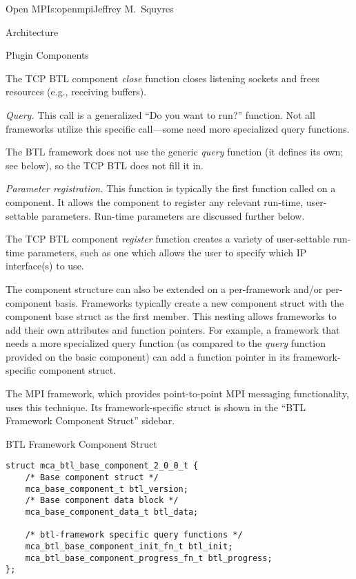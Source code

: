 \begin{aosachapter}{Open MPI}{s:openmpi}{Jeffrey M.\ Squyres}
\begin{aosasect1}{Architecture}
\begin{aosasect2}{Plugin Components}
\begin{aosaitemize}
  The TCP BTL component \emph{close} function closes listening sockets
  and frees resources (e.g., receiving buffers).

\item \emph{Query.} This call is a generalized ``Do you want to run?''
  function.  Not all frameworks utilize this specific call---some
  need more specialized query functions.

  The BTL framework does not use the generic \emph{query} function (it
  defines its own; see below), so the TCP BTL does not fill it in.

\item \emph{Parameter registration.} This function is typically the
  first function called on a component.  It allows the component to
  register any relevant run-time, user-settable parameters.  Run-time
  parameters are discussed further below.


  The TCP BTL component \emph{register} function creates a variety of
  user-settable run-time parameters, such as one which allows the
  user to specify which IP interface(s) to use.
\end{aosaitemize}

The component structure can also be extended on a per-framework and/or
per-component basis.  Frameworks typically create a new component
struct with the component base struct as the first member.
%
This nesting allows frameworks to add their own attributes and
function pointers.  
%
For example, a framework that needs a more specialized query function
(as compared to the \emph{query} function provided on the basic
component) can add a function pointer in its framework-specific
component struct.

The MPI  framework, which provides point-to-point MPI
messaging functionality, uses this technique.  Its framework-specific
struct is shown in the ``BTL Framework Component Struct'' sidebar.

\begin{aosabox}{BTL Framework Component Struct}
\begin{verbatim}
struct mca_btl_base_component_2_0_0_t {
    /* Base component struct */
    mca_base_component_t btl_version;
    /* Base component data block */
    mca_base_component_data_t btl_data;

    /* btl-framework specific query functions */
    mca_btl_base_component_init_fn_t btl_init;
    mca_btl_base_component_progress_fn_t btl_progress;
};
\end{verbatim}
\end{aosabox}


\end{aosasect2}
\end{aosasect1}
\end{aosachapter}
